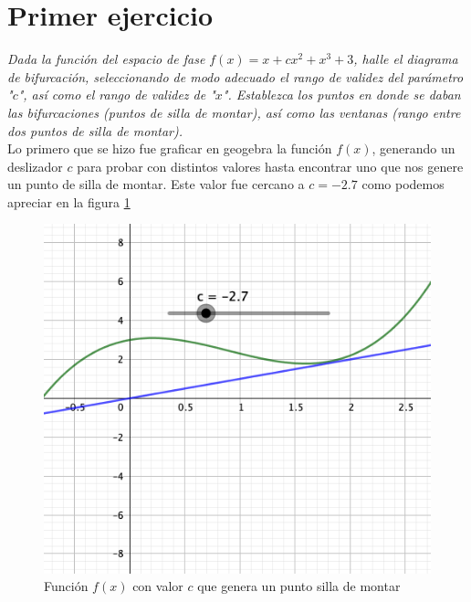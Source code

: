 \documentclass[11pt]{report}
\theoremstyle{plain}
\theoremstyle{definition}
\begin{document}

\tableofcontents

\section{Primer ejercicio}
\textit{Dada la función del espacio de fase $f(x) = x+cx^2+x^3+3$, halle el diagrama de bifurcación, seleccionando de modo adecuado el rango de validez del parámetro "$c$", así como el rango de validez de "$x$". Establezca los puntos en donde se daban las bifurcaciones (puntos de silla de montar), así como las ventanas (rango entre dos puntos de silla de montar).}\\

Lo primero que se hizo fue graficar en geogebra la función $f(x)$, generando un deslizador $c$ para probar con distintos valores hasta encontrar uno que nos genere un punto de silla de montar. Este valor fue cercano a $c=-2.7$ como podemos apreciar en la figura \ref{fig:Eje1_1}

\begin{figure}[!h] %
	\centering
	\includegraphics[scale=0.6]{caos_1_1.png}
	\caption{Función $f(x)$ con valor $c$ que genera un punto silla de montar}
	\label{fig:Eje1_1}
\end{figure}
\end{document}
